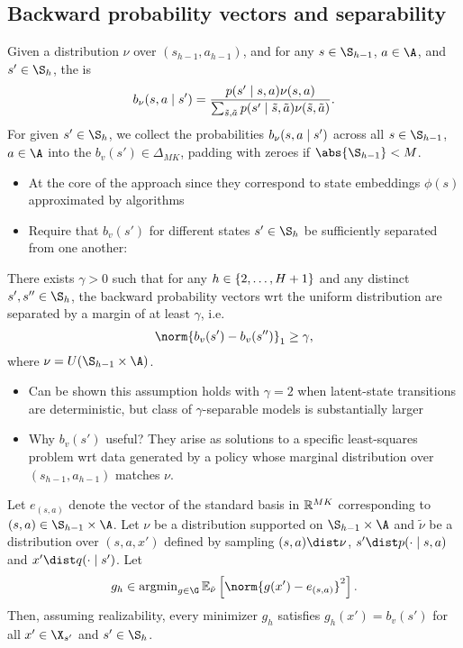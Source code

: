 \documentclass[11pt, openany]{book}
\begin{document}
\subsection{Backward probability vectors and separability}
\begin{definition}
    Given a distribution $\nu$ over $(s_{h-1},a_{h-1})$, and for any $s\in\S_{h-1}$, $a\in\A$, and $s'\in\S_h$, the  is
    \[
        b_\nu(s,a\mid s') = \frac{ p(s'\mid s,a) \nu(s,a) }{ \sum_{\tilde{s},\tilde{a}} p(s'\mid\tilde{s},\tilde{a}) \nu(\tilde{s},\tilde{a}) }.
    \]
    For given $s'\in\S_h$, we collect the probabilities $b_\nu(s,a\mid s')$ across all $s\in\S_{h-1}$, $a\in\A$ into the  $b_v(s')\in\Delta_{MK}$, padding with zeroes if $\abs{\S_{h-1}} < M$.
\end{definition}

\begin{itemize}
    \item At the core of the approach since they correspond to state embeddings $\phi(s)$ approximated by algorithms
    \item Require that $b_v(s')$ for different states $s'\in\S_h$ be sufficiently separated from one another:
\end{itemize}

\begin{definition}
    There exists $\gamma>0$ such that for any $h\in\left\lbrace2,\dots,H+1\right\rbrace$ and any distinct $s',s''\in\S_h$, the backward probability vectors wrt the uniform distribution are separated by a margin of at least $\gamma$, i.e.
    \[
        \norm{b_v(s') - b_v(s'')}_1 \geq \gamma,
    \]
    where $\nu = U(\S_{h-1}\times\A)$.
\end{definition}

\begin{itemize}
    \item Can be shown this assumption holds with $\gamma=2$ when latent-state transitions are deterministic, but class of $\gamma$-separable models is substantially larger
    \item Why $b_v(s')$ useful? They arise as solutions to a specific least-squares problem wrt data generated by a policy whose marginal distribution over $(s_{h-1},a_{h-1})$ matches $\nu$.
\end{itemize}

\begin{theorem}
    Let $e_{(s,a)}$ denote the vector of the standard basis in $\mathbb{R}^{MK}$ corresponding to $(s,a)\in\S_{h-1}\times\A$. Let $\nu$ be a distribution supported on $\S_{h-1}\times\A$ and $\tilde\nu$ be a distribution over $(s,a,x')$ defined by sampling $(s,a)\dist\nu$, $s'\dist p(\cdot\given s,a)$ and $x'\dist q(\cdot\given s')$. Let
    \[
        g_h \in \argmin_{g\in\G} \E_{\tilde\nu} \left[ \norm{g(x') - e_{(s,a)}}^2 \right].
    \]
    Then, assuming realizability, every minimizer $g_h$ satisfies $g_h(x')=b_v(s')$ for all $x'\in\X_{s'}$ and $s'\in\S_h$.
\end{theorem}
\end{document}
